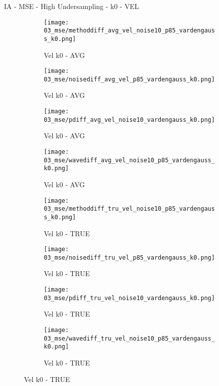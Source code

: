 \documentclass{beamer}
\begin{document}
\begin{frame}{IA - MSE - High Undersampling - k0 - VEL}{}
\begin{figure}
\begin{subfigure}{0.24\textwidth}
\texttt{[image: 03\_mse/methoddiff\_avg\_vel\_noise10\_p85\_vardengauss\_k0.png]}
\vspace{-20pt}
\caption*{\tiny Vel k0 - AVG}
\end{subfigure}
\begin{subfigure}{0.24\textwidth}
\texttt{[image: 03\_mse/noisediff\_avg\_vel\_p85\_vardengauss\_k0.png]}
\vspace{-20pt}
\caption*{\tiny Vel k0 - AVG}
\end{subfigure}
\begin{subfigure}{0.24\textwidth}
\texttt{[image: 03\_mse/pdiff\_avg\_vel\_noise10\_vardengauss\_k0.png]}
\vspace{-20pt}
\caption*{\tiny Vel k0 - AVG}
\end{subfigure}
\begin{subfigure}{0.24\textwidth}
\texttt{[image: 03\_mse/wavediff\_avg\_vel\_noise10\_p85\_vardengauss\_k0.png]}
\vspace{-20pt}
\caption*{\tiny Vel k0 - AVG}
\end{subfigure}

\begin{subfigure}{0.24\textwidth}
\texttt{[image: 03\_mse/methoddiff\_tru\_vel\_noise10\_p85\_vardengauss\_k0.png]}
\vspace{-20pt}
\caption*{\tiny Vel k0 - TRUE}
\end{subfigure}
\begin{subfigure}{0.24\textwidth}
\texttt{[image: 03\_mse/noisediff\_tru\_vel\_p85\_vardengauss\_k0.png]}
\vspace{-20pt}
\caption*{\tiny Vel k0 - TRUE}
\end{subfigure}
\begin{subfigure}{0.24\textwidth}
\texttt{[image: 03\_mse/pdiff\_tru\_vel\_noise10\_vardengauss\_k0.png]}
\vspace{-20pt}
\caption*{\tiny Vel k0 - TRUE}
\end{subfigure}
\begin{subfigure}{0.24\textwidth}
\texttt{[image: 03\_mse/wavediff\_tru\_vel\_noise10\_p85\_vardengauss\_k0.png]}
\vspace{-20pt}
\caption*{\tiny Vel k0 - TRUE}
\end{subfigure}
\end{figure}
\end{frame}
\end{document}
